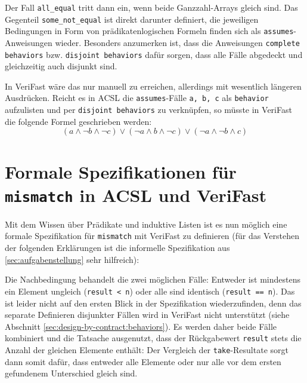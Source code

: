 

Der Fall \lstinline{all_equal} tritt dann ein, wenn beide Ganzzahl-Arrays gleich sind. Das 
Gegenteil \lstinline{some_not_equal} ist direkt darunter definiert, die jeweiligen Bedingungen in Form von
prädikatenlogischen Formeln finden sich als \lstinline{assumes}-Anweisungen wieder. Besonders anzumerken ist,
dass die Anweisungen \lstinline{complete behaviors} bzw. \lstinline{disjoint behaviors} dafür sorgen, dass
alle Fälle abgedeckt und gleichzeitig auch disjunkt sind.

In VeriFast wäre das nur manuell zu erreichen, allerdings mit wesentlich längeren Ausdrücken. Reicht 
es in ACSL die \lstinline{assumes}-Fälle \lstinline{a, b, c} als \lstinline{behavior} 
aufzulisten und per \lstinline{disjoint behaviors} zu verknüpfen, so müsste in VeriFast die folgende
Formel geschrieben werden:
\[(a \land \neg b \land \neg c) \lor (\neg a \land b \land \neg c) \lor (\neg a \land \neg b \land c)\]


\section{Formale Spezifikationen für \texttt{mismatch} in ACSL und VeriFast}

Mit dem Wissen über Prädikate und induktive Listen ist es nun möglich eine formale Spezifikation für \lstinline{mismatch} mit VeriFast
zu definieren (für das Verstehen der folgenden Erklärungen ist die informelle Spezifikation aus 
\ref{sec:aufgabenstellung} sehr hilfreich):



Die Nachbedingung behandelt die zwei möglichen Fälle: Entweder ist mindestens ein Element ungleich
(\lstinline{result < n}) oder alle sind identisch (\lstinline{result == n}). Das ist leider nicht auf den
ersten Blick in der Spezifikation wiederzufinden, denn das separate Definieren disjunkter Fällen wird in VeriFast 
nicht unterstützt (siehe Abschnitt \ref{sec:design-by-contract:behaviors}). Es werden daher beide Fälle kombiniert
und die Tatsache ausgenutzt, dass der Rückgabewert \lstinline{result} stets die Anzahl der gleichen Elemente enthält:
Der Vergleich der \lstinline{take}-Resultate sorgt dann somit dafür, dass entweder alle Elemente oder nur
alle vor dem ersten gefundenem Unterschied gleich sind. 

